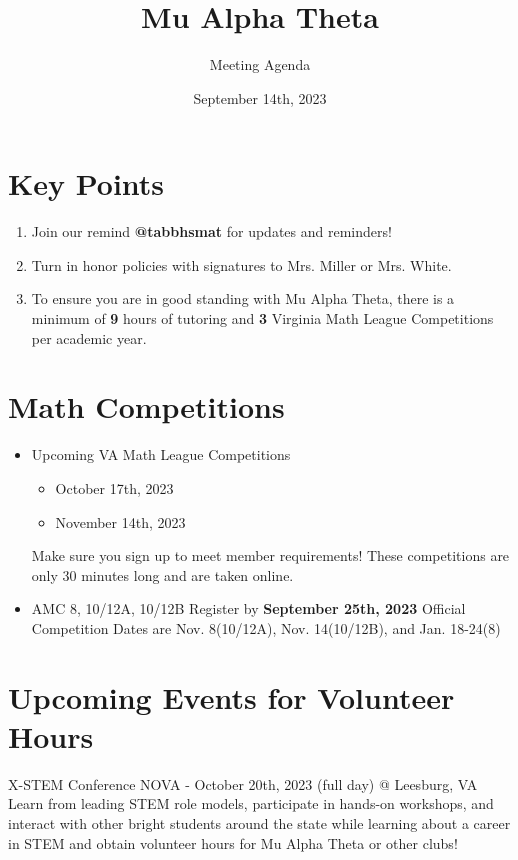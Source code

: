 \documentclass[11pt]{article}
\author{Meeting Agenda}
\title{Mu Alpha Theta}
\date{September 14th, 2023}
\begin{document}
  \maketitle

  \section{Key Points}
    \begin{enumerate}
        \item Join our remind \textbf{@tabbhsmat} for updates and reminders!
        \item Turn in honor policies with signatures to Mrs. Miller or Mrs. White.
        \item To ensure you are in good standing with Mu Alpha Theta, there is a minimum of \textbf{9} hours of tutoring and \textbf{3} Virginia Math League Competitions per academic year.
    \end{enumerate}
  \section{Math Competitions} 
    \begin{itemize}
        \item Upcoming VA Math League Competitions
            \begin{itemize}
                \item October 17th, 2023
                \item November 14th, 2023
            \end{itemize}
            Make sure you sign up to meet member requirements! These competitions are only 30 minutes long and are taken online. 
        \item AMC 8, 10/12A, 10/12B \newline
        Register by \textbf{September 25th, 2023} \newline
        Official Competition Dates are Nov. 8(10/12A), Nov. 14(10/12B), and Jan. 18-24(8)
        
    \end{itemize}
    \section{Upcoming Events for Volunteer Hours}
    \begin{description}
        X-STEM Conference NOVA - October 20th, 2023 (full day) \newline @ Leesburg, VA \newline
        Learn from leading STEM role models, participate in hands-on workshops, and interact with other bright students around the state while learning about a career in STEM and obtain volunteer hours for Mu Alpha Theta or other clubs!
    \end{description}
\end{document}
